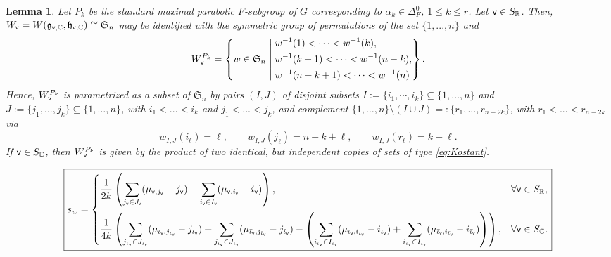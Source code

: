 \documentclass[10pt,a4paper]{amsart}
\newtheorem{lem}{Lemma}
\def\C{\mathbb C}
\def\R{\mathbb R}
\def\g{\mathfrak g}
\def\h{\mathfrak h}
\def\vv{{\sf v}} %
\begin{document}
\begin{lem}\label{lem:Kostant}
Let $P_k$ be the standard maximal parabolic $F$-subgroup of $G$ corresponding to $\alpha_k\in\Delta^0_F$, $1\leq k\leq r$. Let $\vv\in S_\R$. Then, $W_\vv=W(\g_{\vv,\C},\h_{\vv,\C})\cong \mathfrak S_n$ may be identified with the symmetric group of permutations of the set $\{1,...,n\}$ and 
\begin{equation}\label{eq:Kostant}
W_\vv^{P_k}=
\left\{
w \in \mathfrak S_n \;\middle|\;
\begin{aligned}
& w^{-1}(1) < \cdots < w^{-1}(k), \\
& w^{-1}(k+1) < \cdots < w^{-1}(n-k), \\
& w^{-1}(n-k+1) < \cdots < w^{-1}(n)
\end{aligned}
\right\}.
\end{equation}
Hence, $W_\vv^{P_k}$ is parametrized as a subset of $\mathfrak S_n$ by pairs $(I,J)$ of disjoint subsets
$I:=\{i_1, \cdots, i_k\}\subseteq\{1,\dots,n\}$ and $J:=\{j_1,...,j_{k}\}\subseteq\{1,\dots,n\}$, with $i_1<...<i_k$ and $j_1<...<j_k$, and complement
$\{1,\dots,n\}\setminus (I\cup J)=:\{r_1, ..., r_{n-2k}\}$, with $r_1< ...< r_{n-2k}$ via
$$
w_{I,J}(i_\ell)=\ell,\qquad w_{I,J}(j_\ell)=n-k+\ell, \qquad w_{I,J}(r_\ell)=k+\ell.
$$
If $\vv\in S_\C$, then $W_\vv^{P_k}$ is given by the product of two identical, but independent copies of sets of type \eqref{eq:Kostant}.
\end{lem}

\begin{equation}\label{sw}
\boxed{s_{w}
=
\begin{cases}
\displaystyle
\frac{1}{2k}
\left(\sum_{j_\vv\in J_\vv}(\mu_{{\vv},j_\vv}-j_\vv)
-
\sum_{i_\vv\in I_\vv}(\mu_{{\vv},i_\vv}-i_\vv)\right),
&\forall \vv\in S_\R,\\[16pt]
\displaystyle
\frac{1}{4k}
\left(\sum_{j_{\iota_\vv}\in J_{\iota_\vv}}(\mu_{{\iota_\vv},j_{\iota_\vv}}-j_{\iota_\vv})+\sum_{j_{\bar\iota_\vv}\in J_{\bar\iota_\vv}}(\mu_{{\bar\iota_\vv},j_{\bar\iota_\vv}}-j_{\bar\iota_\vv})
-
\left(\sum_{i_{\iota_\vv}\in I_{\iota_\vv}}(\mu_{{\iota_\vv},i_{\iota_\vv}}-i_{\iota_\vv})
+
\sum_{i_{\bar\iota_\vv}\in I_{\bar\iota_\vv}}(\mu_{{\bar\iota_\vv},i_{\bar\iota_\vv}}-i_{\bar\iota_\vv})\right)\right),
& \forall\vv\in S_\C.
\end{cases}}
\end{equation}\normalsize

\subsubsection{}\label{sect:extex}
\end{document}
